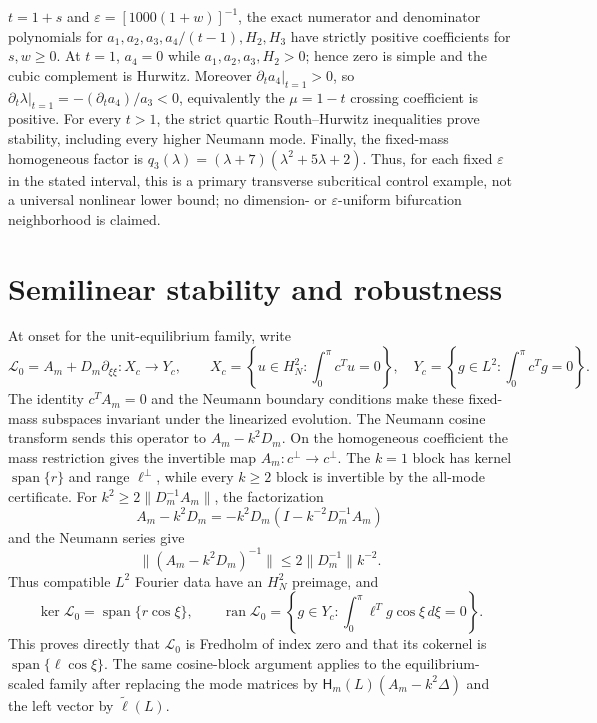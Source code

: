 \documentclass[10pt]{article}
\newcommand{\1}{\mathbf1}
\begin{document}
$t=1+s$ and $\varepsilon=[1000(1+w)]^{-1}$, the exact numerator and
denominator polynomials for
$a_1,a_2,a_3,a_4/(t-1),H_2,H_3$ have strictly positive coefficients for
$s,w\ge0$.  At $t=1$, $a_4=0$ while $a_1,a_2,a_3,H_2>0$; hence zero is
simple and the cubic complement is Hurwitz.  Moreover
$\partial_ta_4|_{t=1}>0$, so
$\partial_t\lambda|_{t=1}=-(\partial_ta_4)/a_3<0$, equivalently the
$\mu=1-t$ crossing coefficient is positive.  For every $t>1$, the strict
quartic Routh--Hurwitz inequalities prove stability, including every higher
Neumann mode.  Finally, the fixed-mass homogeneous factor is
$q_3(\lambda)=(\lambda+7)(\lambda^2+5\lambda+2)$.  Thus, for each fixed
$\varepsilon$ in the stated interval, this is a primary transverse
subcritical control example, not a universal nonlinear lower bound; no
dimension- or $\varepsilon$-uniform bifurcation neighborhood is claimed.

\section{Semilinear stability and robustness}

At onset for the unit-equilibrium family, write
\[
 \mathcal L_0=A_m+D_m\partial_{\xi\xi}:X_c\longrightarrow Y_c,
 \qquad
 X_c=\left\{u\in H_N^2:\int_0^\pi c^Tu=0\right\},\quad
 Y_c=\left\{g\in L^2:\int_0^\pi c^Tg=0\right\}.
\]
The identity $c^TA_m=0$ and the Neumann boundary conditions make these
fixed-mass subspaces invariant under the linearized evolution.
The Neumann cosine transform sends this operator to
$A_m-k^2D_m$.  On the homogeneous coefficient the mass restriction gives the
invertible map $A_m:c^\perp\to c^\perp$.  The $k=1$ block has kernel
$\operatorname{span}\{r\}$ and range $\ell^\perp$, while every $k\ge2$ block
is invertible by the all-mode certificate.  For
$k^2\ge2\|D_m^{-1}A_m\|$, the factorization
\[
 A_m-k^2D_m=-k^2D_m(I-k^{-2}D_m^{-1}A_m)
\]
and the Neumann series give
\[
 \|(A_m-k^2D_m)^{-1}\|
 \le 2\|D_m^{-1}\|k^{-2}.
\]
Thus compatible $L^2$ Fourier data have an $H_N^2$ preimage, and
\[
 \ker\mathcal L_0=\operatorname{span}\{r\cos\xi\},\qquad
 \operatorname{ran}\mathcal L_0
 =\left\{g\in Y_c:\int_0^\pi\ell^Tg\cos\xi\,d\xi=0\right\}.
\]
This proves directly that $\mathcal L_0$ is Fredholm of index zero and that
its cokernel is $\operatorname{span}\{\ell\cos\xi\}$.  The same cosine-block
argument applies to the equilibrium-scaled family after replacing the mode
matrices by $\mathsf H_m(L)(A_m-k^2\Delta)$ and the left vector by
$\widetilde\ell(L)$.
\end{document}
